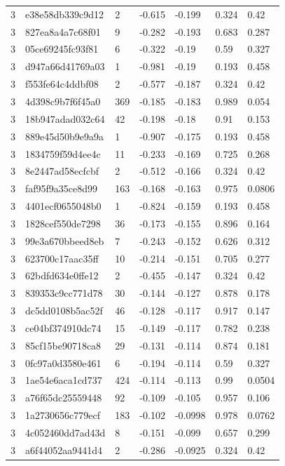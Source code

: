 \begin{tabular}{lllllll}
3 & e38e58db339c9d12 & 2 & -0.615 & -0.199 & 0.324 & 0.42 \\
3 & 827ea8a4a7c68f01 & 9 & -0.282 & -0.193 & 0.683 & 0.287 \\
3 & 05ce69245fc93f81 & 6 & -0.322 & -0.19 & 0.59 & 0.327 \\
3 & d947a66d41769a03 & 1 & -0.981 & -0.19 & 0.193 & 0.458 \\
3 & f553fe64c4ddbf08 & 2 & -0.577 & -0.187 & 0.324 & 0.42 \\
3 & 4d398c9b7f6f45a0 & 369 & -0.185 & -0.183 & 0.989 & 0.054 \\
3 & 18b947adad032c64 & 42 & -0.198 & -0.18 & 0.91 & 0.153 \\
3 & 889e45d50b9e9a9a & 1 & -0.907 & -0.175 & 0.193 & 0.458 \\
3 & 1834759f59d4ee4c & 11 & -0.233 & -0.169 & 0.725 & 0.268 \\
3 & 8e2447ad58ecfcbf & 2 & -0.512 & -0.166 & 0.324 & 0.42 \\
3 & faf95f9a35ce8d99 & 163 & -0.168 & -0.163 & 0.975 & 0.0806 \\
3 & 4401ecf0655048b0 & 1 & -0.824 & -0.159 & 0.193 & 0.458 \\
3 & 1828cef550de7298 & 36 & -0.173 & -0.155 & 0.896 & 0.164 \\
3 & 99e3a670bbeed8eb & 7 & -0.243 & -0.152 & 0.626 & 0.312 \\
3 & 623700c17aac35ff & 10 & -0.214 & -0.151 & 0.705 & 0.277 \\
3 & 62bdfd634e0ffe12 & 2 & -0.455 & -0.147 & 0.324 & 0.42 \\
3 & 839353c9cc771d78 & 30 & -0.144 & -0.127 & 0.878 & 0.178 \\
3 & dc5dd0108b5ac52f & 46 & -0.128 & -0.117 & 0.917 & 0.147 \\
3 & ce04bf374910dc74 & 15 & -0.149 & -0.117 & 0.782 & 0.238 \\
3 & 85cf15be90718ca8 & 29 & -0.131 & -0.114 & 0.874 & 0.181 \\
3 & 0fc97a0d3580e461 & 6 & -0.194 & -0.114 & 0.59 & 0.327 \\
3 & 1ae54e6aca1cd737 & 424 & -0.114 & -0.113 & 0.99 & 0.0504 \\
3 & a76f65dc25559448 & 92 & -0.109 & -0.105 & 0.957 & 0.106 \\
3 & 1a2730656c779ecf & 183 & -0.102 & -0.0998 & 0.978 & 0.0762 \\
3 & 4c052460dd7ad43d & 8 & -0.151 & -0.099 & 0.657 & 0.299 \\
3 & a6f44052aa9441d4 & 2 & -0.286 & -0.0925 & 0.324 & 0.42 \\

\end{tabular}

